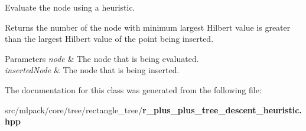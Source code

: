 Evaluate the node using a heuristic. 

Returns the number of the node with minimum largest Hilbert value is greater than the largest Hilbert value of the point being inserted.


\begin{DoxyParams}{Parameters}
{\em node} & The node that is being evaluated. \\
\hline
{\em inserted\+Node} & The node that is being inserted. \\
\hline
\end{DoxyParams}


The documentation for this class was generated from the following file\+:\begin{DoxyCompactItemize}
\item 
src/mlpack/core/tree/rectangle\+\_\+tree/{\bf r\+\_\+plus\+\_\+plus\+\_\+tree\+\_\+descent\+\_\+heuristic.\+hpp}\end{DoxyCompactItemize}
